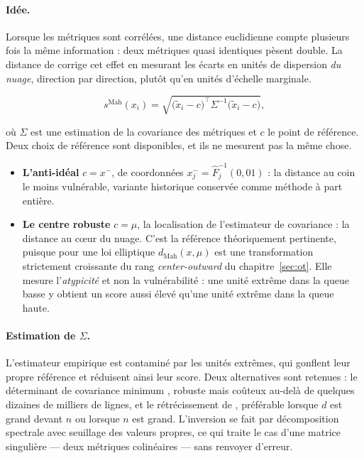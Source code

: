 \documentclass[11pt,a4paper]{article}
\theoremstyle{definition}
\theoremstyle{remark}
\begin{document}
\medskip

\paragraph{Idée.} Lorsque les métriques sont corrélées, une distance euclidienne compte
plusieurs fois la même information : deux métriques quasi identiques pèsent double. La
distance de \citet{mahalanobis1936} corrige cet effet en mesurant les écarts en unités de
dispersion \emph{du nuage}, direction par direction, plutôt qu'en unités d'échelle
marginale.

\medskip

\[
  s^{\mathrm{Mah}}(x_i)
  = \sqrt{\big(\tilde{x}_i - c\big)^{\top} \Sigma^{-1} \big(\tilde{x}_i - c\big)},
\]

\bigskip

où $\Sigma$ est une estimation de la covariance des métriques et $c$ le point de
référence. Deux choix de référence sont disponibles, et ils ne mesurent pas la même chose.

\medskip

\begin{itemize}[nosep,leftmargin=1.4em]
  \item \textbf{L'anti-idéal} $c = x^{-}$, de coordonnées
  $x^{-}_j = \hat{F}_j^{-1}(0{,}01)$ : la distance au coin le moins vulnérable, variante
  historique conservée comme méthode à part entière.
  \item \textbf{Le centre robuste} $c = \mu$, la localisation de l'estimateur de
  covariance : la distance au c\oe ur du nuage. C'est la référence théoriquement
  pertinente, puisque pour une loi elliptique $d_{\mathrm{Mah}}(x, \mu)$ est une
  transformation strictement croissante du rang \emph{center-outward} du
  chapitre~\ref{sec:ot}. Elle mesure l'\emph{atypicité} et non la vulnérabilité : une
  unité extrême dans la queue basse y obtient un score aussi élevé qu'une unité extrême
  dans la queue haute.
\end{itemize}

\bigskip

\paragraph{Estimation de $\Sigma$.} L'estimateur empirique est contaminé par les unités
extrêmes, qui gonflent leur propre référence et réduisent ainsi leur score. Deux
alternatives sont retenues : le déterminant de covariance minimum
\citep[MCD,][]{rousseeuw1999}, robuste mais coûteux au-delà de quelques dizaines de
milliers de lignes, et le rétrécissement de \citet{ledoit2004}, préférable lorsque $d$ est
grand devant $n$ ou lorsque $n$ est grand. L'inversion se fait par décomposition spectrale
avec seuillage des valeurs propres, ce qui traite le cas d'une matrice singulière ---
deux métriques colinéaires --- sans renvoyer d'erreur.
\end{document}
